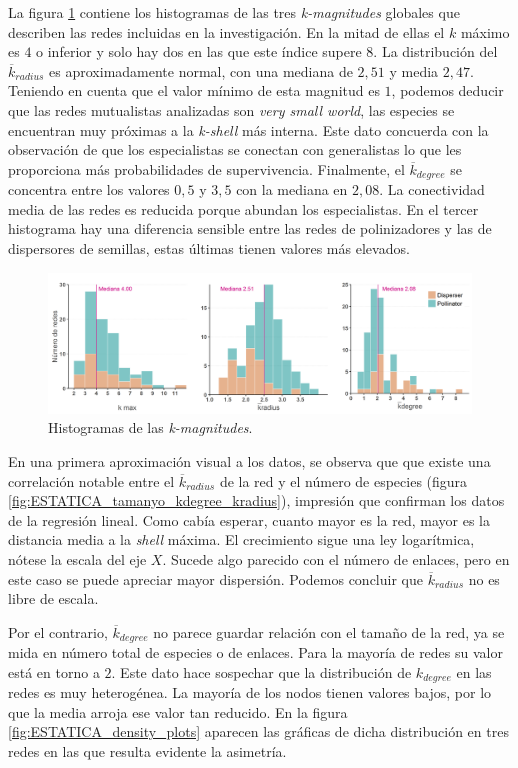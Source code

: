 La figura \ref{fig:ESTATICA_hist_kmagnitudes} contiene los histogramas de las tres \textit{k-magnitudes} globales que describen las redes incluidas en la investigación. En la mitad de ellas el $k$ máximo es $4$ o inferior y solo hay dos en las que este índice supere $8$. La distribución del $\overline{k}_{radius}$ es aproximadamente normal, con una mediana de $2,51$ y media $2,47$. Teniendo en cuenta que el valor mínimo de esta magnitud es $1$, podemos deducir que las redes mutualistas analizadas son \textit{very small world}, las especies se encuentran muy próximas a la \textit{k-shell} más interna. Este dato concuerda con la observación de que los especialistas se conectan con generalistas lo que les proporciona más probabilidades de supervivencia. Finalmente, el $\overline{k}_{degree}$ se
concentra entre los valores $0,5$ y $3,5$ con la mediana en $2,08$. La conectividad media de las redes es reducida
porque abundan los especialistas. En el tercer histograma hay una diferencia sensible entre las redes de polinizadores
y las de dispersores de semillas, estas últimas tienen valores más elevados.

\begin{figure}[h!]
\centering
\includegraphics[scale=0.5]{Figures/ESTATICA_hist_kmagnitudes.png}
\caption{Histogramas de las \textit{k-magnitudes}.}
\label{fig:ESTATICA_hist_kmagnitudes}
\end{figure}

En una primera aproximación visual a los datos, se observa que que existe una correlación notable entre el $\overline{k}_{radius}$ de la red y el número de especies (figura \ref{fig:ESTATICA_tamanyo_kdegree_kradius}), impresión que confirman los datos de la regresión lineal. Como cabía esperar, cuanto mayor es la red, mayor es la distancia media a la \textit{shell} máxima. El crecimiento sigue una ley logarítmica, nótese la escala del eje $X$. Sucede algo parecido con el número de enlaces, pero en este caso se puede apreciar mayor dispersión. Podemos concluir que $\overline{k}_{radius}$ no es libre de escala.

Por el contrario, $\overline{k}_{degree}$ no parece guardar relación con el tamaño de la red, ya se mida en número total de especies o de enlaces. Para la mayoría de redes su valor está en torno a $2$. Este dato hace sospechar que la distribución de ${k}_{degree}$ en las redes es muy heterogénea. La mayoría de los nodos tienen valores bajos, por lo que la media arroja ese valor tan reducido. En la figura \ref{fig:ESTATICA_density_plots} aparecen las gráficas de dicha distribución en tres redes en las que resulta evidente la asimetría. 

